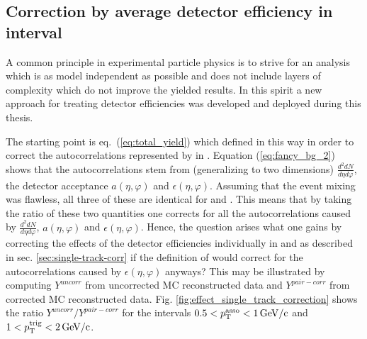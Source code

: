 \subsection{Correction by average detector efficiency in \ptassoc interval}
\label{sec:single-value-correction}

A common principle in experimental particle physics is to strive for an analysis which is as model independent as possible and does not include layers of complexity which do not improve the yielded results. In this spirit a new approach for treating detector efficiencies was developed and deployed during this thesis. 

The starting point is eq.~(\ref{eq:total_yield}) which defined in this way in order to correct the autocorrelations represented by \B in \Sig. Equation (\ref{eq:fancy_bg_2}) shows that the autocorrelations stem from (generalizing to two dimensions) $\frac{d^2dN}{d\eta d\varphi}$, the detector acceptance  $a(\eta, \varphi)$ and $\epsilon(\eta, \varphi)$. Assuming that the event mixing was flawless, all three of these are identical for \Sig and \B. This means that by taking the ratio of these two quantities one corrects for all the autocorrelations caused by $\frac{d^2dN}{d\eta d\varphi}$,  $a(\eta, \varphi)$ and $\epsilon(\eta, \varphi)$. Hence, the question arises what one gains by correcting the effects of the detector efficiencies individually in \Sig and \B as described in sec. \ref{sec:single-track-corr} if the definition of \Y would correct for the autocorrelations caused by $\epsilon(\eta, \varphi)$ anyways? This may be illustrated by computing  $Y^{uncorr}$ from uncorrected MC reconstructed data and  $ Y^{pair-corr}$ from corrected MC reconstructed data. Fig. \ref{fig:effect_single_track_correction} shows the ratio $Y^{uncorr}/Y^{pair-corr}$ for the intervals $0.5 < p_{\text{T}}^{\text{asso}} < \SI{1}{GeV/c}$ and $1 < p_{\text{T}}^{\text{trig}} < \SI{2}{GeV/c}$.


